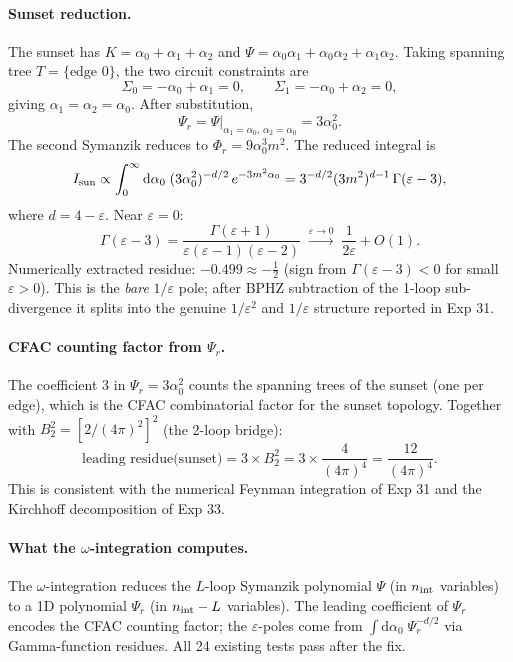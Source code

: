\documentclass[11pt,a4paper]{article}
\theoremstyle{plain}
\newcommand{\dd}{\mathrm{d}}
\begin{document}
\paragraph{Sunset reduction.}
The sunset has $K = \alpha_0+\alpha_1+\alpha_2$ and
$\Psi = \alpha_0\alpha_1 + \alpha_0\alpha_2 + \alpha_1\alpha_2$.
Taking spanning tree $T = \{\text{edge 0}\}$, the two circuit constraints are
\[
  \Sigma_0 = -\alpha_0 + \alpha_1 = 0, \qquad
  \Sigma_1 = -\alpha_0 + \alpha_2 = 0,
\]
giving $\alpha_1 = \alpha_2 = \alpha_0$.  After substitution,
\[
  \Psi_r = \Psi\big|_{\alpha_1=\alpha_0,\,\alpha_2=\alpha_0} = 3\alpha_0^2.
\]
The second Symanzik reduces to $\Phi_r = 9\alpha_0^3 m^2$.
The reduced integral is
\[
  I_{\rm sun} \propto \int_0^\infty \dd\alpha_0\;
  (3\alpha_0^2)^{-d/2}\, e^{-3m^2\alpha_0}
  = 3^{-d/2}(3m^2)^{d-1}\,\Gamma(\varepsilon - 3),
\]
where $d = 4 - \varepsilon$.  Near $\varepsilon = 0$:
\[
  \Gamma(\varepsilon - 3) = \frac{\Gamma(\varepsilon+1)}{\varepsilon(\varepsilon-1)(\varepsilon-2)}
  \;\xrightarrow{\varepsilon\to 0}\; \frac{1}{2\varepsilon} + O(1).
\]
Numerically extracted residue: $-0.499 \approx -\frac{1}{2}$ (sign from
$\Gamma(\varepsilon-3)<0$ for small $\varepsilon>0$).  This is the \emph{bare}
$1/\varepsilon$ pole; after BPHZ subtraction of the 1-loop sub-divergence it
splits into the genuine $1/\varepsilon^2$ and $1/\varepsilon$ structure
reported in Exp 31.

\paragraph{CFAC counting factor from $\Psi_r$.}
The coefficient $3$ in $\Psi_r = 3\alpha_0^2$ counts the spanning trees of
the sunset (one per edge), which is the CFAC combinatorial factor for the
sunset topology.  Together with $B_2^2 = [2/(4\pi)^2]^2$ (the 2-loop bridge):
\[
  \text{leading residue(sunset)} = 3 \times B_2^2
  = 3 \times \frac{4}{(4\pi)^4} = \frac{12}{(4\pi)^4}.
\]
This is consistent with the numerical Feynman integration of Exp 31 and the
Kirchhoff decomposition of Exp 33.

\paragraph{What the $\omega$-integration computes.}
The $\omega$-integration reduces the $L$-loop Symanzik polynomial $\Psi$ (in
$n_{\rm int}$ variables) to a 1D polynomial $\Psi_r$ (in $n_{\rm int}-L$
variables).  The leading coefficient of $\Psi_r$ encodes the CFAC counting
factor; the $\varepsilon$-poles come from $\int \dd\alpha_0\;\Psi_r^{-d/2}$
via Gamma-function residues.  All 24 existing tests pass after the fix.
\end{document}
